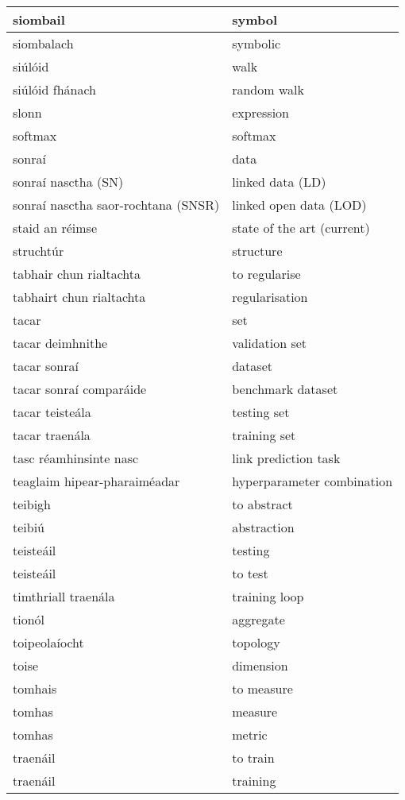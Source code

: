 \begin{longtable}{|l|l|}
		siombail&symbol\\ \hline 
		siombalach&symbolic\\ \hline 
		siúlóid&walk\\ \hline 
		siúlóid fhánach&random walk\\ \hline 
		slonn&expression\\ \hline 
		softmax&softmax\\ \hline 
		sonraí&data\\ \hline 
		sonraí nasctha (SN)&linked data (LD)\\ \hline 
		sonraí nasctha saor-rochtana (SNSR)&linked open data (LOD)\\ \hline 
		staid an réimse&state of the art (current)\\ \hline 
		struchtúr&structure\\ \hline 
		tabhair chun rialtachta&to regularise\\ \hline 
		tabhairt chun rialtachta&regularisation\\ \hline 
		tacar&set\\ \hline 
		tacar deimhnithe&validation set\\ \hline 
		tacar sonraí&dataset\\ \hline 
		tacar sonraí comparáide&benchmark dataset\\ \hline 
		tacar teisteála&testing set\\ \hline 
		tacar traenála&training set\\ \hline 
		tasc réamhinsinte nasc&link prediction task\\ \hline 
		teaglaim hipear-pharaiméadar&hyperparameter combination\\ \hline 
		teibigh&to abstract\\ \hline 
		teibiú&abstraction\\ \hline 
		teisteáil&testing\\ \hline 
		teisteáil&to test\\ \hline 
		timthriall traenála&training loop\\ \hline 
		tionól&aggregate\\ \hline 
		toipeolaíocht&topology\\ \hline 
		toise&dimension\\ \hline 
		tomhais&to measure\\ \hline 
		tomhas&measure\\ \hline 
		tomhas&metric\\ \hline 
		traenáil&to train\\ \hline 
		traenáil&training\\ \hline 

\end{longtable}
